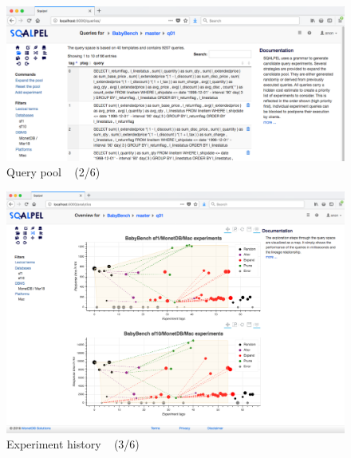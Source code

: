 \documentclass{cidr-2019}
\begin{document}


\begin{figure}[t!]
\centering
\includegraphics[width=\textwidth]{Figures/querypool2.png}
\caption{Query pool ~ \textsf{(2/6)}
	\label{fig:querypool2}}
\end{figure}



\begin{figure}[t!]
\centering
\includegraphics[width=\textwidth]{Figures/history2.png}
\caption{Experiment history ~ \textsf{(3/6)}
	\label{fig:history}}
\end{figure}
\end{document}
